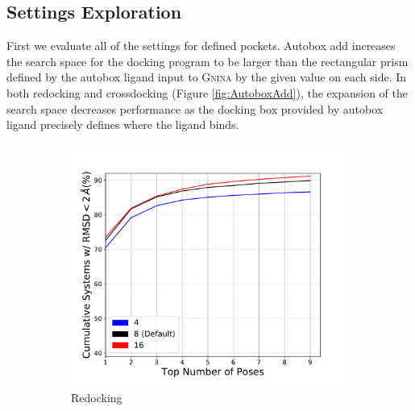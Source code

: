 \documentclass[journal=jcisd8,manuscript=article]{achemso}
\begin{document}
\subsection{Settings Exploration}

First we evaluate all of the settings for defined pockets. Autobox add increases the search space for the docking program to be larger than the rectangular prism defined by the autobox ligand input to \textsc{Gnina} by the given value on each side. In both redocking and crossdocking (Figure \ref{fig:AutoboxAdd}), the expansion of the search space decreases performance as the docking box provided by autobox ligand precisely defines where the ligand binds.

\begin{figure}    
        \begin{subfigure}[b]{0.48\textwidth}    
		\centering
		\includegraphics[width=\textwidth]{figures/redocking/sweep_exhaustiveness_line.pdf}
		\caption{Redocking}
		\label{fig:exhaustiveness rd}
        \end{subfigure}    
        \begin{subfigure}[b]{0.48\textwidth}    
		\centering

\end{subfigure}
\end{figure}
\end{document}
